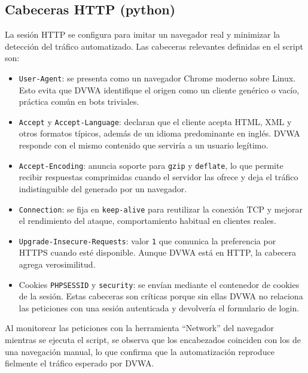 \documentclass[letterpaper,12pt]{article}
\let\origsubsection\subsection
\renewcommand{\subsection}{\FloatBarrier\origsubsection}
\begin{document}
\subsection{Cabeceras HTTP (python)}

La sesión HTTP se configura para imitar un navegador real y minimizar la detección del tráfico automatizado. Las cabeceras relevantes definidas en el script son:
\begin{itemize}
    \item \verb|User-Agent|: se presenta como un navegador Chrome moderno sobre Linux. Esto evita que DVWA identifique el origen como un cliente genérico o vacío, práctica común en bots triviales.
    \item \verb|Accept| y \verb|Accept-Language|: declaran que el cliente acepta HTML, XML y otros formatos típicos, además de un idioma predominante en inglés. DVWA responde con el mismo contenido que serviría a un usuario legítimo.
    \item \verb|Accept-Encoding|: anuncia soporte para \verb|gzip| y \verb|deflate|, lo que permite recibir respuestas comprimidas cuando el servidor las ofrece y deja el tráfico indistinguible del generado por un navegador.
    \item \verb|Connection|: se fija en \verb|keep-alive| para reutilizar la conexión TCP y mejorar el rendimiento del ataque, comportamiento habitual en clientes reales.
    \item \verb|Upgrade-Insecure-Requests|: valor \verb|1| que comunica la preferencia por HTTPS cuando esté disponible. Aunque DVWA está en HTTP, la cabecera agrega verosimilitud.
    \item Cookies \verb|PHPSESSID| y \verb|security|: se envían mediante el contenedor de cookies de la sesión. Estas cabeceras son críticas porque sin ellas DVWA no relaciona las peticiones con una sesión autenticada y devolvería el formulario de login.
\end{itemize}

Al monitorear las peticiones con la herramienta ``Network'' del navegador mientras se ejecuta el script, se observa que los encabezados coinciden con los de una navegación manual, lo que confirma que la automatización reproduce fielmente el tráfico esperado por DVWA.
\end{document}
